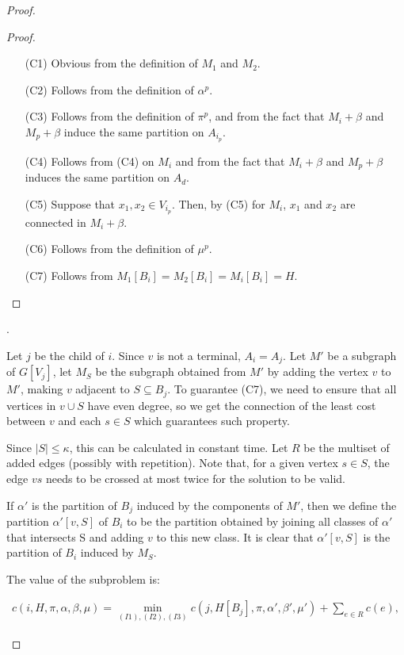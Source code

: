\begin{proof}
\begin{proof}
\begin{itemize}
    \item[(C1)] Obvious from the definition of \(M_1\) and \(M_2\).
    \item[(C2)] Follows from the definition of \(\alpha^p\).
    \item[(C3)] Follows from the definition of \(\pi^p\), and from the fact that \(M_i + \beta\) and \(M_p + \beta\) induce the same partition on \(A_{i_p}\).
    \item[(C4)] Follows from (C4) on \(M_i\) and from the fact that \(M_i + \beta\) and \(M_p + \beta\) induces the same partition on \(A_d\).
    \item[(C5)] Suppose that \(x_1, x_2 \in V_{i_p}\). Then, by (C5) for \(M_i\), \(x_1 \) and \(x_2\) are connected in \(M_i + \beta\).
    \item[(C6)] Follows from the definition of \(\mu^p\).
    \item[(C7)] Follows from \(M_1[B_i] = M_2[B_i] = M_i[B_i] = H\).
\end{itemize}
\end{proof}

.

\begin{claim}
Let \(j\) be the child of \(i\). Since \(v\) is not a terminal, \(A_i = A_j\). Let \(M'\) be a subgraph of \(G[V_j]\), let \(M_S\) be the subgraph obtained from \(M'\) by adding the vertex \(v\) to \(M'\), making \(v\) adjacent to \(S \subseteq B_j\). To guarantee (C7), we need to ensure that all vertices in \(v \cup S\) have even degree, so we get the connection of the least cost between \(v\) and each \(s \in S\) which guarantees such property.

Since \(|S| \leq \kappa\), this can be calculated in constant time. Let \(R\) be the multiset of added edges (possibly with repetition). Note that, for a given vertex \(s \in S\), the edge \(vs\) needs to be crossed at most twice for the solution to be valid.

If \(\alpha'\) is the partition of \(B_j\) induced by the components of \(M'\), then we define the partition \(\alpha' [v, S]\) of \(B_i\) to be the partition obtained by joining all classes of \(\alpha'\) that intersects S and adding \(v\) to this new class. It is clear that \(\alpha'[v, S]\) is the partition of \(B_i\) induced by \(M_S\).

The value of the subproblem is:

\begin{align*}
c(i, H, \pi, \alpha, \beta, \mu) = \min_{(I1), (I2), (I3)} c(j, H[B_j], \pi, \alpha', \beta', \mu') + \sum_{e \in R}c(e),
\end{align*}


\end{claim}
\end{proof}
